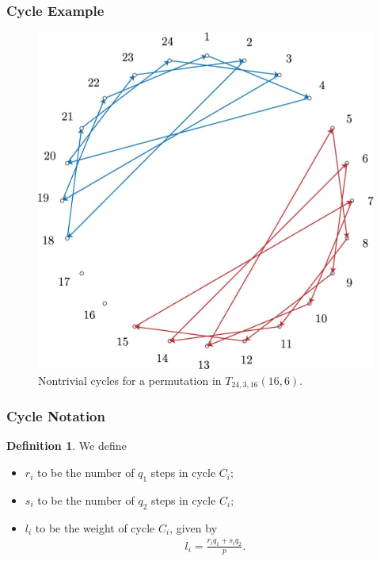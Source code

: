 \documentclass{beamer}
\theoremstyle{plain}
\theoremstyle{definition}
\newtheorem{Def}[theorem]{Definition}
\theoremstyle{remark}
\newcommand{\bee}{\begin{equation}\begin{aligned}}
\newcommand{\eee}{\end{aligned}\end{equation}}
\newcommand{\fracc}{\frac}				%
\renewcommand{\'}{\hspace{0.5mm}'}		%
\begin{document}
\begin{frame}
\frametitle{Cycle Example}

	\begin{figure}
		\includegraphics[scale=0.15]{circ_24_3_16_16_6.jpg}
		\caption{Nontrivial cycles for a permutation in
		$T_{24,3,16}(16,6)$. }
	\end{figure}


\end{frame}


\begin{frame}
\frametitle{Cycle Notation}
	\begin{Def}
		We define
		\begin{itemize}
			\item $r_i$ to be the number of $q_1$ steps in cycle
			$C_i$;
			\item $s_i$ to be the number of $q_2$ steps in cycle
			$C_i$;
			\item $l_i$ to be the weight of cycle $C_i$, given 
			by
			\bee
				l_i = \fracc{r_iq_1 + s_iq_2}{p}. 
			\eee
		\end{itemize}
	\end{Def}


\end{frame}
\end{document}

